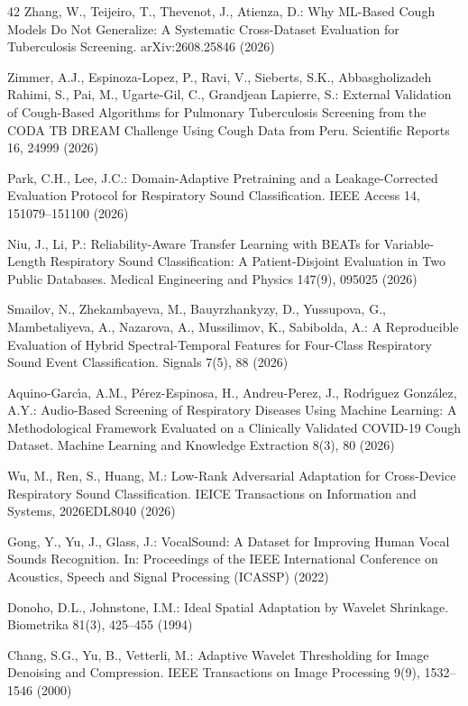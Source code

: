 \begin{thebibliography}{42}
Zhang, W., Teijeiro, T., Thevenot, J., Atienza, D.: Why ML-Based Cough Models Do Not Generalize: A Systematic Cross-Dataset Evaluation for Tuberculosis Screening. arXiv:2608.25846 (2026)

Zimmer, A.J., Espinoza-Lopez, P., Ravi, V., Sieberts, S.K., Abbasgholizadeh Rahimi, S., Pai, M., Ugarte-Gil, C., Grandjean Lapierre, S.: External Validation of Cough-Based Algorithms for Pulmonary Tuberculosis Screening from the CODA TB DREAM Challenge Using Cough Data from Peru. Scientific Reports 16, 24999 (2026)

Park, C.H., Lee, J.C.: Domain-Adaptive Pretraining and a Leakage-Corrected Evaluation Protocol for Respiratory Sound Classification. IEEE Access 14, 151079–151100 (2026)

Niu, J., Li, P.: Reliability-Aware Transfer Learning with BEATs for Variable-Length Respiratory Sound Classification: A Patient-Disjoint Evaluation in Two Public Databases. Medical Engineering and Physics 147(9), 095025 (2026)

Smailov, N., Zhekambayeva, M., Bauyrzhankyzy, D., Yussupova, G., Mambetaliyeva, A., Nazarova, A., Mussilimov, K., Sabibolda, A.: A Reproducible Evaluation of Hybrid Spectral-Temporal Features for Four-Class Respiratory Sound Event Classification. Signals 7(5), 88 (2026)

Aquino-Garc{\'\i}a, A.M., P{\'e}rez-Espinosa, H., Andreu-Perez, J., Rodr{\'\i}guez Gonz{\'a}lez, A.Y.: Audio-Based Screening of Respiratory Diseases Using Machine Learning: A Methodological Framework Evaluated on a Clinically Validated COVID-19 Cough Dataset. Machine Learning and Knowledge Extraction 8(3), 80 (2026)

Wu, M., Ren, S., Huang, M.: Low-Rank Adversarial Adaptation for Cross-Device Respiratory Sound Classification. IEICE Transactions on Information and Systems, 2026EDL8040 (2026)

Gong, Y., Yu, J., Glass, J.: VocalSound: A Dataset for Improving Human Vocal Sounds Recognition. In: Proceedings of the IEEE International Conference on Acoustics, Speech and Signal Processing (ICASSP) (2022)

Donoho, D.L., Johnstone, I.M.: Ideal Spatial Adaptation by Wavelet Shrinkage. Biometrika 81(3), 425–455 (1994)

Chang, S.G., Yu, B., Vetterli, M.: Adaptive Wavelet Thresholding for Image Denoising and Compression. IEEE Transactions on Image Processing 9(9), 1532–1546 (2000)


\end{thebibliography}
